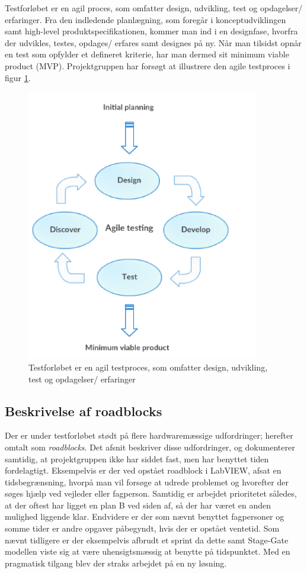 Testforløbet er en agil proces, som omfatter design, udvikling, test og opdagelser/ erfaringer. Fra den indledende planlægning, som foregår i konceptudviklingen samt high-level produktspecifikationen, kommer man ind i en designfase, hvorfra der udvikles, testes, opdages/ erfares samt designes på ny. Når man tilsidst opnår en test som opfylder et defineret kriterie, har man dermed sit minimum viable product (MVP). Projektgruppen har forsøgt at illustrere den agile testproces i figur \ref{fig:agiletesting}. 

		\begin{figure}[htb]
			\centering
				\includegraphics[width=4in]{AgileTesting}
				\caption{Testforløbet er en agil testproces, som omfatter design, udvikling, test og opdagelser/ erfaringer}
				\label{fig:agiletesting}
			\end{figure}
 

\subsection{Beskrivelse af roadblocks}
\label{subsec:roadblocks}
Der er under testforløbet stødt på flere hardwaremæssige udfordringer; herefter omtalt som \textit{roadblocks}. Det afsnit beskriver disse udfordringer, og dokumenterer samtidig, at projektgruppen ikke har siddet fast, men har benyttet tiden fordelagtigt. Eksempelvis er der ved opstået roadblock i LabVIEW, afsat en tidsbegrænsning, hvorpå man vil forsøge at udrede problemet og hvorefter der søges hjælp ved vejleder eller fagperson. Samtidig er arbejdet prioritetet således, at der oftest har ligget en plan B ved siden af, så der har været en anden mulighed liggende klar. Endvidere er der som nævnt benyttet fagpersoner og somme tider er andre opgaver påbegyndt, hvis der er opstået ventetid.  
Som nævnt tidligere er der eksempelvis afbrudt et sprint da dette samt Stage-Gate modellen viste sig at være uhensigtsmæssig at benytte på tidspunktet. Med en pragmatisk tilgang blev der straks arbejdet på en ny løsning.   

